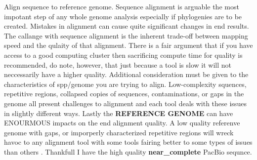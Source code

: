 \documentclass{article}
\begin{document}
    
    Align sequence to reference genome.  Sequence alignment is arguable the most impotant step of any whole genome analysis especially if phylogenies are to be created.  Mistakes in alignment can cause quite significant changes in end results.  The callange with sequence alignment is the inherent trade-off between mapping speed and the qulaity of that alignment.  There is a fair argument that if you have access to a good computing cluster then sacrificing compute time for quality is recommended, do note, however, that just because a tool is slow it will not neccessarily have a higher quality. Additional consideration must be given to the characteristics of spp/genome you are trying to align.  Low-complexity squences, repetitive regions, collapsed copies of sequences, contaminations, or gaps in the genome all present challenges to alignment and each tool deals with these issues in slightly different ways.   Lastly the \textbf{REFERENCE GENOME} can have ENOURMOUS impacts on the end alignment quality.  A low quality referenve genome with gaps, or imporperly characterized repetitive regions will wreck havoc to any alignment tool with some tools fairing better to some types of issues than others \cite{schilbertComparisonReadMapping2020}.  Thankfull I have the high quality \textbf{near\_complete} PacBio sequnce.
        
\end{document}
